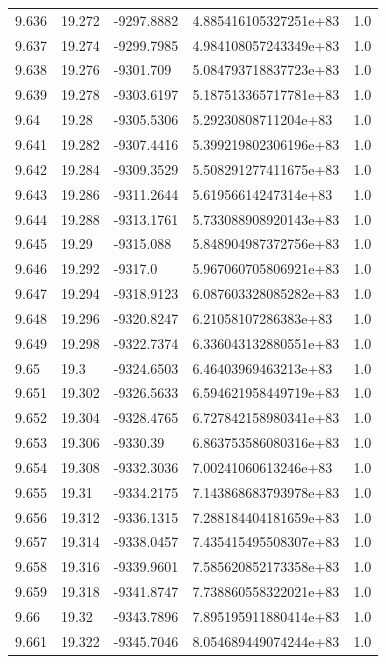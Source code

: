 \begin{tabular}{lllll}
9.636 & 19.272 & -9297.8882 & 4.885416105327251e+83 & 1.0 \\
9.637 & 19.274 & -9299.7985 & 4.984108057243349e+83 & 1.0 \\
9.638 & 19.276 & -9301.709 & 5.084793718837723e+83 & 1.0 \\
9.639 & 19.278 & -9303.6197 & 5.187513365717781e+83 & 1.0 \\
9.64 & 19.28 & -9305.5306 & 5.29230808711204e+83 & 1.0 \\
9.641 & 19.282 & -9307.4416 & 5.399219802306196e+83 & 1.0 \\
9.642 & 19.284 & -9309.3529 & 5.508291277411675e+83 & 1.0 \\
9.643 & 19.286 & -9311.2644 & 5.61956614247314e+83 & 1.0 \\
9.644 & 19.288 & -9313.1761 & 5.733088908920143e+83 & 1.0 \\
9.645 & 19.29 & -9315.088 & 5.848904987372756e+83 & 1.0 \\
9.646 & 19.292 & -9317.0 & 5.967060705806921e+83 & 1.0 \\
9.647 & 19.294 & -9318.9123 & 6.087603328085282e+83 & 1.0 \\
9.648 & 19.296 & -9320.8247 & 6.21058107286383e+83 & 1.0 \\
9.649 & 19.298 & -9322.7374 & 6.336043132880551e+83 & 1.0 \\
9.65 & 19.3 & -9324.6503 & 6.46403969463213e+83 & 1.0 \\
9.651 & 19.302 & -9326.5633 & 6.594621958449719e+83 & 1.0 \\
9.652 & 19.304 & -9328.4765 & 6.727842158980341e+83 & 1.0 \\
9.653 & 19.306 & -9330.39 & 6.863753586080316e+83 & 1.0 \\
9.654 & 19.308 & -9332.3036 & 7.00241060613246e+83 & 1.0 \\
9.655 & 19.31 & -9334.2175 & 7.143868683793978e+83 & 1.0 \\
9.656 & 19.312 & -9336.1315 & 7.288184404181659e+83 & 1.0 \\
9.657 & 19.314 & -9338.0457 & 7.435415495508307e+83 & 1.0 \\
9.658 & 19.316 & -9339.9601 & 7.585620852173358e+83 & 1.0 \\
9.659 & 19.318 & -9341.8747 & 7.738860558322021e+83 & 1.0 \\
9.66 & 19.32 & -9343.7896 & 7.895195911880414e+83 & 1.0 \\
9.661 & 19.322 & -9345.7046 & 8.054689449074244e+83 & 1.0 \\

\end{tabular}
